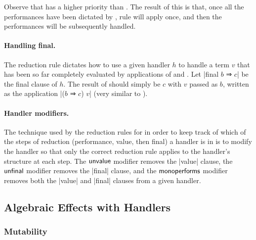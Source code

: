 Observe that  has a higher priority than .
The result of this is that, once all the performances have been dictated by , rule  will apply once, and then the performances will be subsequently handled.

\paragraph{Handling final.}
The reduction rule  dictates how to use a given handler $h$ to handle a term $v$ that has been so far completely evaluated by applications of  and .
Let \code|final $b$ ⇒ $c$| be the final clause of $h$.
The result of  should simply be $c$ with $v$ passed as $b$,
written as the application \code|($b$ ⇒ $c$) $v$| (very similar to ).

\paragraph{Handler modifiers.}
The technique used by the reduction rules for \LangD in order to keep track of which of the steps of reduction (performance, value, then final) a handler is in is to modify the handler so that only the correct reduction rule applies to the handler's structure at each step.
The $\mathsf{unvalue}$ modifier removes the \code|value| clause,
the $\mathsf{unfinal}$ modifier removes the \code|final| clause, and
the $\mathsf{monoperforms}$ modifier removes both the \code|value| and \code|final| clauses from a given handler.





\subsection{Algebraic Effects with Handlers}

\subsubsection{Mutability}

